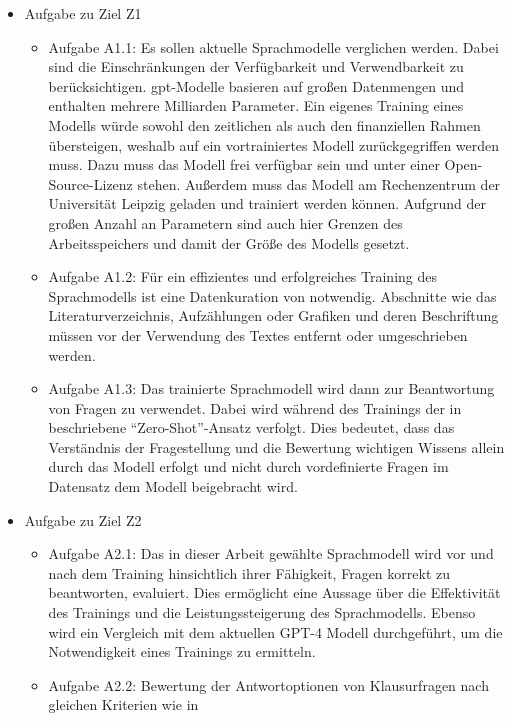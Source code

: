 \begin{itemize}
  \item Aufgabe zu Ziel Z1
        \begin{itemize}
          \item Aufgabe A1.1: Es sollen aktuelle Sprachmodelle verglichen werden. Dabei sind die Einschränkungen der Verfügbarkeit und Verwendbarkeit zu berücksichtigen.
                \ac{gpt}-Modelle basieren auf großen Datenmengen und enthalten mehrere Milliarden Parameter.
                Ein eigenes Training eines Modells würde sowohl den zeitlichen als auch den finanziellen Rahmen übersteigen, weshalb auf ein vortrainiertes Modell zurückgegriffen werden muss.
                Dazu muss das Modell frei verfügbar sein und unter einer Open-Source-Lizenz stehen. Außerdem muss das Modell am Rechenzentrum der Universität Leipzig geladen und trainiert werden können. Aufgrund der großen Anzahl an Parametern sind auch hier Grenzen des Arbeitsspeichers und damit der Größe des Modells gesetzt.
          \item Aufgabe A1.2: Für ein effizientes und erfolgreiches Training des Sprachmodells ist eine Datenkuration von \citet{bb} notwendig.
                Abschnitte wie das Literaturverzeichnis, Aufzählungen oder Grafiken und deren Beschriftung müssen vor der Verwendung des Textes entfernt oder umgeschrieben werden.
          \item Aufgabe A1.3: Das trainierte Sprachmodell wird dann zur Beantwortung von Fragen zu \citet{bb} verwendet.
                Dabei wird während des Trainings der in \citet{gpt3} beschriebene \enquote{Zero-Shot}-Ansatz verfolgt.
                Dies bedeutet, dass das Verständnis der Fragestellung und die Bewertung wichtigen Wissens allein durch das Modell erfolgt und nicht durch vordefinierte Fragen im Datensatz dem Modell beigebracht wird.
        \end{itemize}
  \item Aufgabe zu Ziel Z2
        \begin{itemize}
          \item Aufgabe A2.1: Das in dieser Arbeit gewählte Sprachmodell wird vor und nach dem Training hinsichtlich ihrer Fähigkeit, Fragen korrekt zu beantworten, evaluiert.
                Dies ermöglicht eine Aussage über die Effektivität des Trainings und die Leistungssteigerung des Sprachmodells.\@
                Ebenso wird ein Vergleich mit dem aktuellen GPT-4 Modell \citep{gpt4} durchgeführt, um die Notwendigkeit eines Trainings zu ermitteln.
          \item Aufgabe A2.2: Bewertung der Antwortoptionen von Klausurfragen nach gleichen Kriterien wie in \citet{chatgpt_qas}
        \end{itemize}
\end{itemize}

